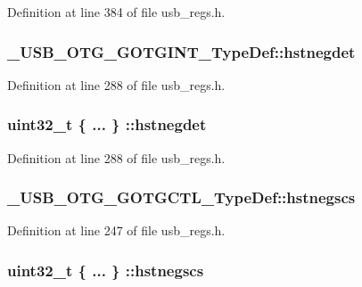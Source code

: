 Definition at line 384 of file usb\-\_\-regs.\-h.

\hypertarget{group___u_s_b___o_t_g___d_r_i_v_e_r_ga31938c28140ff521cead9f6178569b80}{
\subsubsection[{hstnegdet}]{ \-\_\-\-U\-S\-B\-\_\-\-O\-T\-G\-\_\-\-G\-O\-T\-G\-I\-N\-T\-\_\-\-Type\-Def\-::hstnegdet}}\label{group___u_s_b___o_t_g___d_r_i_v_e_r_ga31938c28140ff521cead9f6178569b80}


Definition at line 288 of file usb\-\_\-regs.\-h.

\hypertarget{group___u_s_b___o_t_g___d_r_i_v_e_r_gaee2a9f695e0c65116ba6956b9da2f436}{
\subsubsection[{hstnegdet}]{\setlength{\rightskip}{0pt plus 5cm}uint32\-\_\-t \{ ... \} \-::hstnegdet}}\label{group___u_s_b___o_t_g___d_r_i_v_e_r_gaee2a9f695e0c65116ba6956b9da2f436}


Definition at line 288 of file usb\-\_\-regs.\-h.

\hypertarget{group___u_s_b___o_t_g___d_r_i_v_e_r_gab946d22c3ce448cb5400c80a67741c7d}{
\subsubsection[{hstnegscs}]{ \-\_\-\-U\-S\-B\-\_\-\-O\-T\-G\-\_\-\-G\-O\-T\-G\-C\-T\-L\-\_\-\-Type\-Def\-::hstnegscs}}\label{group___u_s_b___o_t_g___d_r_i_v_e_r_gab946d22c3ce448cb5400c80a67741c7d}


Definition at line 247 of file usb\-\_\-regs.\-h.

\hypertarget{group___u_s_b___o_t_g___d_r_i_v_e_r_gaabc36fe8d152c0ab0bc0f0ec677e6dea}{
\subsubsection[{hstnegscs}]{\setlength{\rightskip}{0pt plus 5cm}uint32\-\_\-t \{ ... \} \-::hstnegscs}}\label{group___u_s_b___o_t_g___d_r_i_v_e_r_gaabc36fe8d152c0ab0bc0f0ec677e6dea}


